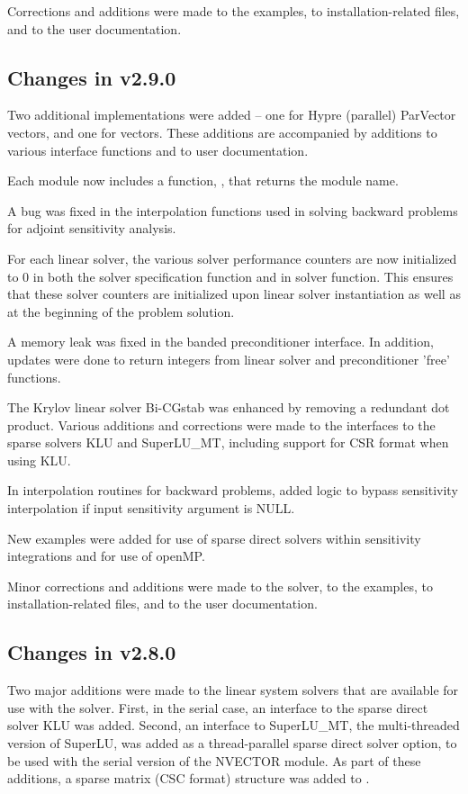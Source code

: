 Corrections and additions were made to the examples, 
to installation-related files,
and to the user documentation.


\subsection*{Changes in v2.9.0}

Two additional {\nvector} implementations were added -- one for
Hypre (parallel) ParVector vectors, and one for {\petsc} vectors.  These
additions are accompanied by additions to various interface functions
and to user documentation.

Each {\nvector} module now includes a function, ,
that returns the {\nvector} module name.

A bug was fixed in the interpolation functions used in solving
backward problems for adjoint sensitivity analysis.

For each linear solver, the various solver performance counters are
now initialized to 0 in both the solver specification function and in
solver  function.  This ensures that these solver counters
are initialized upon linear solver instantiation as well as at the
beginning of the problem solution.

A memory leak was fixed in the banded preconditioner interface.
In addition, updates were done to return integers from linear solver 
and preconditioner 'free' functions.

The Krylov linear solver Bi-CGstab was enhanced by removing a redundant
dot product.  Various additions and corrections were made to the
interfaces to the sparse solvers KLU and SuperLU\_MT, including support
for CSR format when using KLU.

In interpolation routines for backward problems, added logic to bypass 
sensitivity interpolation if input sensitivity argument is NULL.

New examples were added for use of sparse direct solvers within sensitivity
integrations and for use of openMP.  

Minor corrections and additions were made to the {\cvodes} solver, to the
examples, to installation-related files, and to the user documentation.

\subsection*{Changes in v2.8.0}

Two major additions were made to the linear system solvers that are
available for use with the {\cvodes} solver.  First, in the serial case,
an interface to the sparse direct solver KLU was added.
Second, an interface to SuperLU\_MT, the multi-threaded version of
SuperLU, was added as a thread-parallel sparse direct solver option,
to be used with the serial version of the NVECTOR module.
As part of these additions, a sparse matrix (CSC format) structure 
was added to {\cvodes}.

